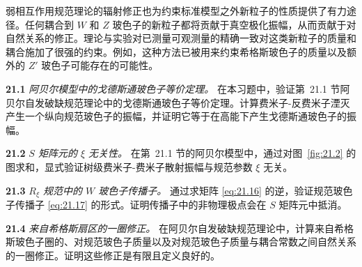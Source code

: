 弱相互作用规范理论的辐射修正也为约束标准模型之外新粒子的性质提供了有力途径。任何耦合到 $W$ 和 $Z$ 玻色子的新粒子都将贡献于真空极化振幅，从而贡献于对自然关系的修正。理论与实验对已测量可观测量的精确一致对这类新粒子的质量和耦合施加了很强的约束。例如，这种方法已被用来约束希格斯玻色子的质量以及额外的 $Z'$ 玻色子可能存在的可能性。

\problems

\textbf{21.1} \emph{阿贝尔模型中的戈德斯通玻色子等价定理。} 在本习题中，验证第~21.1 节阿贝尔自发破缺规范理论中的戈德斯通玻色子等价定理。计算费米子-反费米子湮灭产生一个纵向规范玻色子的振幅，并证明它等于在高能下产生戈德斯通玻色子的振幅。

\textbf{21.2} \emph{$S$ 矩阵元的 $\xi$ 无关性。} 在第~21.1 节的阿贝尔模型中，通过对图~\ref{fig:21.2} 的图求和，显式验证树级费米子-费米子散射振幅与规范参数 $\xi$ 无关。

\textbf{21.3} \emph{$R_\xi$ 规范中的 $W$ 玻色子传播子。} 通过求矩阵 \eqref{eq:21.16} 的逆，验证规范玻色子传播子 \eqref{eq:21.17} 的形式。证明传播子中的非物理极点会在 $S$ 矩阵元中抵消。

\textbf{21.4} \emph{来自希格斯扇区的一圈修正。} 在阿贝尔自发破缺规范理论中，计算来自希格斯玻色子圈的、对规范玻色子质量以及对规范玻色子质量与耦合常数之间自然关系的一圈修正。证明这些修正是有限且定义良好的。

